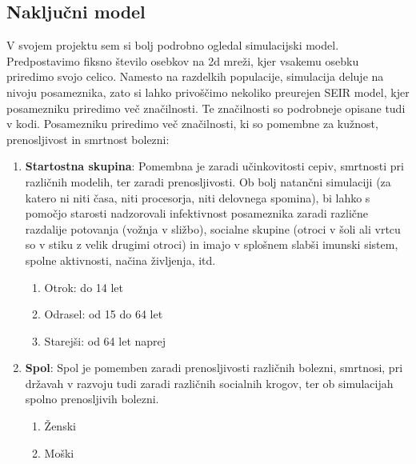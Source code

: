 \documentclass[a4paper, 11pt]{article}
\begin{document}
\subsection*{Naključni model}
V svojem projektu sem si bolj podrobno ogledal simulacijski model. Predpostavimo fiksno število osebkov na 2d mreži, kjer vsakemu osebku priredimo svojo celico. Namesto na razdelkih populacije, simulacija deluje na nivoju posameznika, zato si lahko privoščimo nekoliko preurejen SEIR model, kjer posamezniku priredimo več značilnosti. Te značilnosti so podrobneje opisane tudi v kodi. Posamezniku priredimo več značilnosti, ki so pomembne za kužnost, prenosljivost in smrtnost bolezni:
\begin{enumerate}
\item \textbf{Startostna skupina}: Pomembna je zaradi učinkovitosti cepiv, smrtnosti pri različnih modelih, ter zaradi prenosljivosti. Ob bolj natančni simulaciji (za katero ni niti časa, niti procesorja, niti delovnega spomina), bi lahko s pomočjo starosti nadzorovali infektivnost posameznika zaradi različne razdalije potovanja (vožnja v sližbo), socialne skupine (otroci v šoli ali vrtcu so v stiku z velik drugimi otroci) in imajo v splošnem slabši imunski sistem, spolne aktivnosti, načina življenja, itd.
\begin{enumerate}
\item Otrok: do 14 let
\item Odrasel: od 15 do 64 let
\item Starejši: od 64 let naprej
\end{enumerate}

\item \textbf{Spol}: Spol je pomemben zaradi prenosljivosti različnih bolezni, smrtnosi, pri državah v razvoju tudi zaradi različnih socialnih krogov, ter ob simulacijah spolno prenosljivih bolezni.
\begin{enumerate}
\item Ženski
\item Moški
\end{enumerate}


\end{enumerate}
\end{document}

